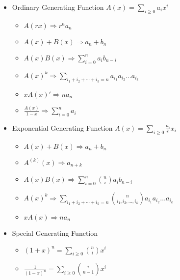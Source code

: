 \begin{itemize}
    \item Ordinary Generating Function
    $A(x) = \sum_{i\ge 0} a_ix^i$
    \begin{itemize}
        \itemsep-0.5em
        \item $A(rx)             \Rightarrow r^na_n$
        \item $A(x) + B(x)       \Rightarrow a_n + b_n$
        \item $A(x)B(x)          \Rightarrow \sum_{i=0}^{n} a_ib_{n-i}$
        \item $A(x)^k            \Rightarrow \sum_{i_1+i_2+\cdots+i_k=n} a_{i_1}a_{i_2}\ldots a_{i_k}$
        \item $xA(x)'            \Rightarrow na_n$
        \item $\frac{A(x)}{1-x}  \Rightarrow \sum_{i=0}^{n} a_i$
    \end{itemize}
    \item Exponential Generating Function
    $A(x) = \sum_{i\ge 0} \frac{a_i}{i!}x_i$
    \begin{itemize}
        \itemsep-0.5em
        \item $A(x) + B(x)       \Rightarrow a_n + b_n$
        \item $A^{(k)}(x)        \Rightarrow a_{n+k}$
        \item $A(x)B(x)          \Rightarrow \sum_{i=0}^{n} \binom{n}{i}a_ib_{n-i}$
        \item $A(x)^k            \Rightarrow \sum_{i_1+i_2+\cdots+i_k=n} \binom{n}{i_1, i_2, \ldots, i_k}a_{i_1}a_{i_2}\ldots a_{i_k}$
        \item $xA(x)             \Rightarrow na_n$
    \end{itemize}
    \item Special Generating Function
    \begin{itemize}
        \itemsep-0.5em
        \item $(1+x)^n           = \sum_{i\ge 0} \binom{n}{i}x^i$
        \item $\frac{1}{(1-x)^n} = \sum_{i\ge 0} \binom{i}{n-1}x^i$
    \end{itemize}
    \end{itemize}